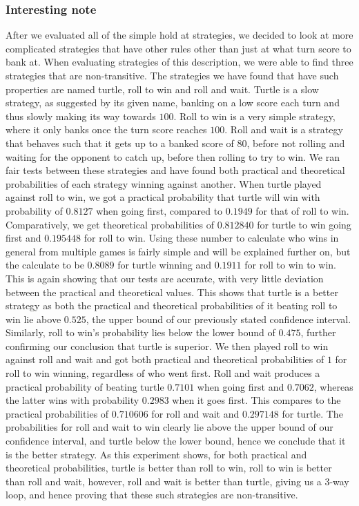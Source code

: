 \documentclass[a4paper,titlepage]{article}
\begin{document}
\subsubsection{Interesting note}
After we evaluated all of the simple hold at strategies, we decided to look at more complicated strategies that have other rules other than just at what turn score to bank at. When evaluating strategies of this description, we were able to find three strategies that are non-transitive. The strategies we have found that have such properties are named turtle, roll to win and roll and wait. Turtle is a slow strategy, as suggested by its given name, banking on a low score each turn and thus slowly making its way towards $100$. Roll to win is a very simple strategy, where it only banks once the turn score reaches $100$. Roll and wait is a strategy that behaves such that it gets up to a banked score of $80$, before not rolling and waiting for the opponent to catch up, before then rolling to try to win. We ran fair tests between these strategies and have found both practical and theoretical probabilities of each strategy winning against another. When turtle played against roll to win, we got a practical probability that turtle will win with probability of $0.8127$ when going first, compared to $0.1949$ for that of roll to win. Comparatively, we get theoretical probabilities of $0.812840$ for turtle to win going first and $0.195448$ for roll to win. Using these number to calculate who wins in general from multiple games is fairly simple and will be explained further on, but the calculate to be $0.8089$ for turtle winning and $0.1911$ for roll to win to win. This is again showing that our tests are accurate, with very little deviation between the practical and theoretical values. This shows that turtle is a better strategy as both the practical and theoretical probabilities of it beating roll to win lie above $0.525$, the upper bound of our previously stated confidence interval. Similarly, roll to win’s probability lies below the lower bound of $0.475$, further confirming our conclusion that turtle is superior. We then played roll to win against roll and wait and got both practical and theoretical probabilities of $1$ for roll to win winning, regardless of who went first. Roll and wait produces a practical probability of beating turtle $0.7101$ when going first and $0.7062$, whereas the latter wins with probability $0.2983$ when it goes first. This compares to the practical probabilities of $0.710606$ for roll and wait and $0.297148$ for turtle. The probabilities for roll and wait to win clearly lie above the upper bound of our confidence interval, and turtle below the lower bound, hence we conclude that it is the better strategy. As this experiment shows, for both practical and theoretical probabilities, turtle is better than roll to win, roll to win is better than roll and wait, however, roll and wait is better than turtle, giving us a 3-way loop, and hence proving that these such strategies are non-transitive.
\end{document}

